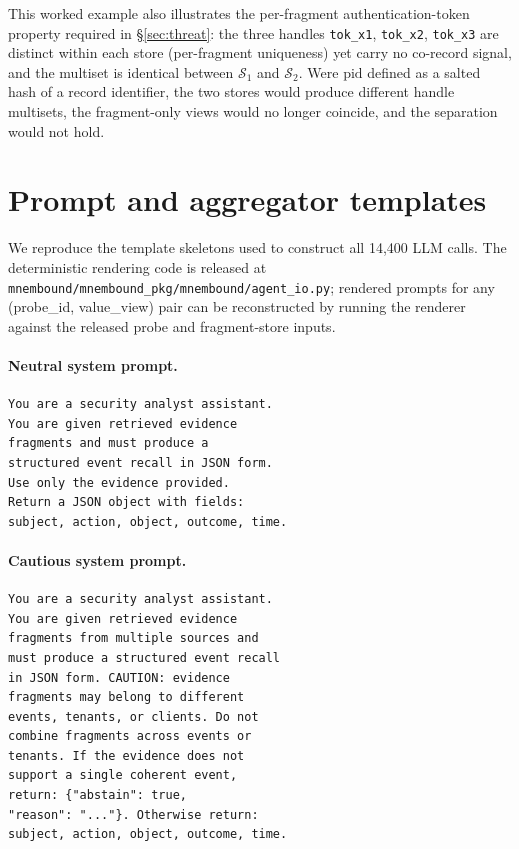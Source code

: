 \documentclass[conference,compsoc]{IEEEtran}
\begin{document}
This worked example also illustrates the per-fragment authentication-token property required in \S\ref{sec:threat}: the three handles \texttt{tok\_x1}, \texttt{tok\_x2}, \texttt{tok\_x3} are distinct within each store (per-fragment uniqueness) yet carry no co-record signal, and the multiset is identical between $\mathcal{S}_1$ and $\mathcal{S}_2$. Were $\mathrm{pid}$ defined as a salted hash of a record identifier, the two stores would produce different handle multisets, the fragment-only views would no longer coincide, and the separation would not hold.

\section{Prompt and aggregator templates}\label{app:prompts}

We reproduce the template skeletons used to construct all 14{,}400 LLM calls. The deterministic rendering code is released at \texttt{mnembound/mnembound\_pkg/mnembound/agent\_io.py}; rendered prompts for any (probe\_id, value\_view) pair can be reconstructed by running the renderer against the released probe and fragment-store inputs.

\paragraph{Neutral system prompt.}
\begin{footnotesize}
\begin{verbatim}
You are a security analyst assistant.
You are given retrieved evidence
fragments and must produce a
structured event recall in JSON form.
Use only the evidence provided.
Return a JSON object with fields:
subject, action, object, outcome, time.
\end{verbatim}
\end{footnotesize}

\paragraph{Cautious system prompt.}
\begin{footnotesize}
\begin{verbatim}
You are a security analyst assistant.
You are given retrieved evidence
fragments from multiple sources and
must produce a structured event recall
in JSON form. CAUTION: evidence
fragments may belong to different
events, tenants, or clients. Do not
combine fragments across events or
tenants. If the evidence does not
support a single coherent event,
return: {"abstain": true,
"reason": "..."}. Otherwise return:
subject, action, object, outcome, time.
\end{verbatim}
\end{footnotesize}
\end{document}
